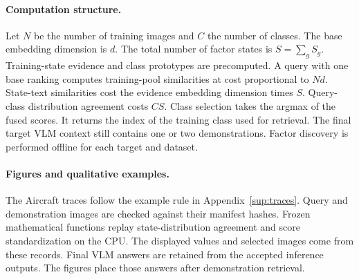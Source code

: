 \documentclass[10pt,twocolumn,letterpaper]{article}
\begin{document}
\paragraph{Computation structure.}
Let $N$ be the number of training images and $C$ the number of classes. The base embedding dimension is $d$. The total number of factor states is $S=\sum_gS_g$. Training-state evidence and class prototypes are precomputed. A query with one base ranking computes training-pool similarities at cost proportional to $Nd$. State-text similarities cost the evidence embedding dimension times $S$. Query-class distribution agreement costs $CS$. Class selection takes the argmax of the fused scores. It returns the index of the training class used for retrieval. The final target VLM context still contains one or two demonstrations. Factor discovery is performed offline for each target and dataset.

\paragraph{Figures and qualitative examples.}
The Aircraft traces follow the example rule in Appendix~\ref{sup:traces}. Query and demonstration images are checked against their manifest hashes. Frozen mathematical functions replay state-distribution agreement and score standardization on the CPU. The displayed values and selected images come from these records. Final VLM answers are retained from the accepted inference outputs. The figures place those answers after demonstration retrieval.

{\small


}
\end{document}
